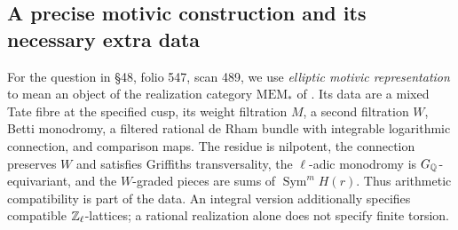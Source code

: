 \subsection{A precise motivic construction and its necessary extra data}

For the question in \S48, folio 547, scan 489, we use
\emph{elliptic motivic representation} to mean an object of
the realization category \(\mathrm{MEM}_*\) of
\citet[Definition 6.1]{D_HainMatsumoto2020}.
Its data are a mixed Tate fibre at the specified cusp,
its weight filtration \(M\), a second filtration \(W\),
Betti monodromy, a filtered rational de Rham bundle with
integrable logarithmic connection, and comparison maps.
The residue is nilpotent, the connection preserves \(W\)
and satisfies Griffiths transversality, the \(\ell\)-adic
monodromy is \(G_\mathbb Q\)-equivariant, and the \(W\)-graded
pieces are sums of \(\operatorname{Sym}^m H(r)\).
Thus arithmetic compatibility is part of the data.
An integral version additionally specifies compatible
\(\mathbb Z_\ell\)-lattices; a rational realization alone does not
specify finite torsion.

